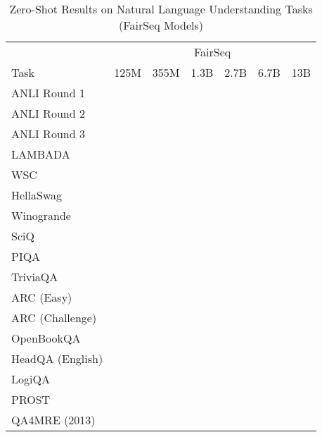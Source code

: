 \documentclass[11pt]{article}
\begin{document}
{\begin{landscape}
\begin{table*}    
\centering \begin{tabular}{l c c c c c c }
 & \multicolumn{6}{c}{FairSeq} \\
 Task & 125M & 355M & 1.3B & 2.7B & 6.7B & 13B\\ \toprule
ANLI Round 1 &  &  &  &  &  &  \\ 
ANLI Round 2 &  &  &  &  &  &  \\ 
ANLI Round 3 &  &  &  &  &  &  \\ 
LAMBADA &  &  &  &  &  &  \\ 
WSC &  &  &  &  &  &  \\ 
HellaSwag &  &  &  &  &  &  \\ 
Winogrande &  &  &  &  &  &  \\ 
SciQ &  &  &  &  &  &  \\ 
PIQA &  &  &  &  &  &  \\ 
TriviaQA &  &  &  &  &  &  \\ 
ARC (Easy) &  &  &  &  &  &  \\ 
ARC (Challenge) &  &  &  &  &  &  \\ 
OpenBookQA &  &  &  &  &  &  \\ 
HeadQA (English) &  &  &  &  &  &  \\ 
LogiQA &  &  &  &  &  &  \\ 
PROST &  &  &  &  &  &  \\ 
QA4MRE (2013) &  &  &  &  &  &  \\\bottomrule
\end{tabular}
\caption{Zero-Shot Results on Natural Language Understanding Tasks (FairSeq Models)}
\label{tab:nlu_fairseq}
\end{table*}




\end{landscape}}
\end{document}
